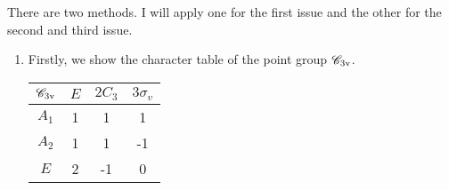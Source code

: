 \documentclass[a4paper]{book}
\begin{document}
	\begin{solution}

		There are two methods. I will apply one for the first issue and the other for the second and third issue.

		\begin{enumerate}[label=(\alph*)]
	
		\item Firstly, we show the character table of the point group $\mathscr{C}_{\rm 3v}$.
		\begin{center}
		\begin{tabular}{cccc}\hline
	$\mathscr{C}_{\rm 3v}$ & $E$ & $2C_3$ & $3\sigma_v$ \\ \hline
			$A_1$	&	1	&	1	&	1	\\
			$A_2$	&	1	&	1	&	-1	\\
			$E$		&	2	&	-1	&	0	\\ \hline
		\end{tabular}
		\end{center}
		

\end{enumerate}
\end{solution}
\end{document}
